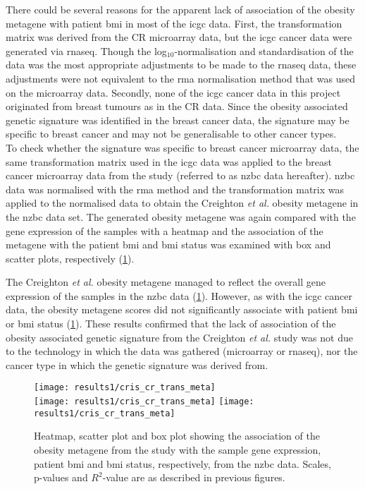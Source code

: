 There could be several reasons for the apparent lack of association of the obesity metagene with patient \gls{bmi} in most of the \gls{icgc} data.
First, the transformation matrix was derived from the CR microarray data, but the \gls{icgc} cancer data were generated via \gls{rnaseq}.
Though the log$_{10}$-normalisation and standardisation of the data was the most appropriate adjustments to be made to the \gls{rnaseq} data, these adjustments were not equivalent to the \gls{rma} normalisation method that was used on the microarray data.
Secondly, none of the \gls{icgc} cancer data in this project originated from breast tumours as in the CR data.
Since the obesity associated genetic signature was identified in the breast cancer data, the signature may be specific to breast cancer and may not be generalisable to other cancer types.
\\

\noindent
To check whether the signature was specific to breast cancer microarray data, the same transformation matrix used in the \gls{icgc} data was applied to the breast cancer microarray data from the \citet{Print2016} study (referred to as \gls{nzbc} data hereafter).
\gls{nzbc} data was normalised with the \gls{rma} method and the transformation matrix was applied to the normalised data to obtain the Creighton \textit{et al.} obesity metagene in the \gls{nzbc} data set.
The generated obesity metagene was again compared with the gene expression of the samples with a heatmap and the association of the metagene with the patient \gls{bmi} and \gls{bmi} status was examined with box and scatter plots, respectively  (\cref{fig:crmetaprint}).

The Creighton \textit{et al.} obesity metagene managed to reflect the overall gene expression of the samples in the \gls{nzbc}  data (\cref{fig:crmetaprint}).
However, as with the \gls{icgc} cancer data, the obesity metagene scores did not significantly associate with patient \gls{bmi} or \gls{bmi} status (\cref{fig:crmetaprint}).
These results confirmed that the lack of association of the obesity associated genetic signature from the Creighton \textit{et al.} study was not due to the technology in which the data was gathered (microarray or \gls{rnaseq}), nor the cancer type in which the genetic signature was derived from.

\begin{figure}[htp!]
	\centering
	\texttt{[image: results1/cris\_cr\_trans\_meta]}\\
	\texttt{[image: results1/cris\_cr\_trans\_meta]}
	\hfill
	\texttt{[image: results1/cris\_cr\_trans\_meta]}
	\caption[Obesity metagene from the \citet{Creighton2012} study in the \gls{nzbc} data]{Heatmap, scatter plot and box plot showing the association of the obesity metagene from the \citet{Creighton2012} study with the sample gene expression, patient \gls{bmi} and \gls{bmi} status, respectively, from the \gls{nzbc} data.
	Scales, p-values and $R^2$-value are as described in previous figures.}
	\label{fig:crmetaprint}
\end{figure}

